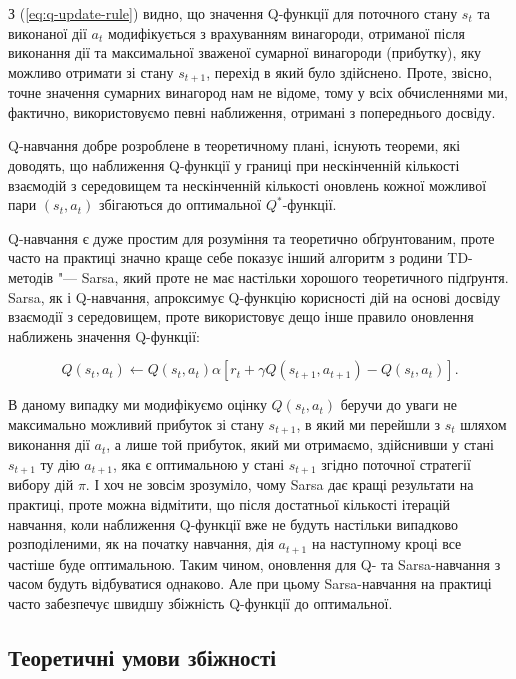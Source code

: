 \documentclass[a4paper,10pt,fleqn]{article}
\begin{document}
З (\ref{eq:q-update-rule}) видно, що значення Q-функції для поточного стану $s_t$ та виконаної дії $a_t$ модифікується з врахуванням винагороди, отриманої після виконання дії та максимальної зваженої сумарної винагороди (прибутку), яку можливо отримати зі стану $s_{t+1}$, перехід в який було здійснено. Проте, звісно, точне значення сумарних винагород нам не відоме, тому у всіх обчисленнями ми, фактично, використовуємо певні наближення, отримані з попереднього досвіду. 

Q-навчання добре розроблене в теоретичному плані, існують теореми, які доводять, що наближення Q-функції у границі при нескінченній кількості взаємодій з середовищем та нескінченній кількості оновлень кожної можливої пари $(s_t,a_t)$ збігаються до оптимальної $Q^*$-функції. 

Q-навчання є дуже простим для розуміння та теоретично обґрунтованим, проте часто на практиці значно краще себе показує інший алгоритм з родини TD-методів "--- Sarsa, який проте не має настільки хорошого теоретичного підґрунтя.  Sarsa, як і Q-навчання, апроксимує Q-функцію корисності дій на основі досвіду взаємодії з середовищем, проте використовує дещо інше правило оновлення наближень значення Q-функції:

\begin{equation}
Q(s_t,a_t) \leftarrow Q(s_t,a_t)  \alpha \left[ r_t + \gamma Q(s_{t+1}, a_{t+1}) - Q(s_t, a_t) \right].
\end{equation}

В даному випадку ми модифікуємо оцінку $Q(s_t,a_t)$ беручи до уваги не максимально можливий прибуток зі стану $s_{t+1}$, в який ми перейшли з $s_t$ шляхом виконання дії $a_t$, а лише той прибуток, який ми отримаємо, здійснивши у стані $s_{t+1}$ ту дію $a_{t+1}$, яка є оптимальною у стані $s_{t+1}$ згідно поточної стратегії вибору дій $\pi$. І хоч не зовсім зрозуміло, чому Sarsa дає кращі результати на практиці, проте можна відмітити, що після достатньої кількості ітерацій навчання, коли наближення Q-функції вже не будуть настільки випадково розподіленими, як на початку навчання, дія $a_{t+1}$ на наступному кроці все частіше буде оптимальною. Таким чином, оновлення для Q- та Sarsa-навчання з часом будуть відбуватися однаково. Але при цьому Sarsa-навчання на практиці часто забезпечує швидшу збіжність Q-функції до оптимальної.

\subsection{Теоретичні умови збіжності}
\end{document}
